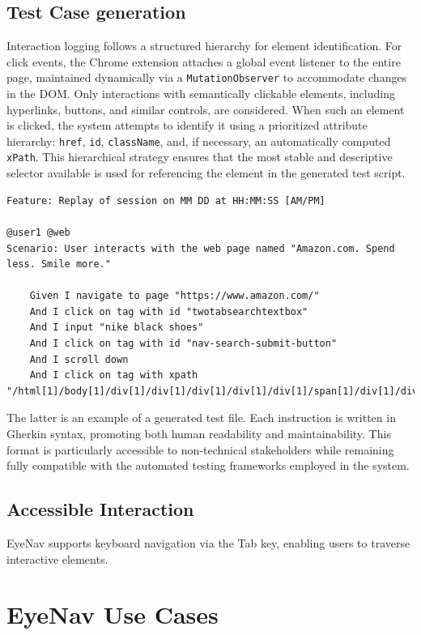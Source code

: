 \subsection{Test Case generation}

Interaction logging follows a structured hierarchy for element identification. For click events, the Chrome extension attaches a global event listener to the entire page, maintained dynamically via a \verb|MutationObserver| to accommodate changes in the DOM. Only interactions with semantically clickable elements, including hyperlinks, buttons, and similar controls, are considered. When such an element is clicked, the system attempts to identify it using a prioritized attribute hierarchy: \verb|href|, \verb|id|, \verb|className|, and, if necessary, an automatically computed \verb|xPath|. This hierarchical strategy ensures that the most stable and descriptive selector available is used for referencing the element in the generated test script.


\begin{lstlisting}
Feature: Replay of session on MM DD at HH:MM:SS [AM/PM]

@user1 @web
Scenario: User interacts with the web page named "Amazon.com. Spend less. Smile more."

	Given I navigate to page "https://www.amazon.com/"
	And I click on tag with id "twotabsearchtextbox"
	And I input "nike black shoes"
	And I click on tag with id "nav-search-submit-button"
	And I scroll down
	And I click on tag with xpath "/html[1]/body[1]/div[1]/div[1]/div[1]/div[1]/div[1]/span[1]/div[1]/div[9]/div[1]/div[1]/span[1]/div[1]/div[1]/div[1]/span[1]/a[1]/div[1]"
\end{lstlisting}

The latter is an example of a generated test file. Each instruction is written in Gherkin syntax, promoting both human readability and maintainability. This format is particularly accessible to non-technical stakeholders while remaining fully compatible with the automated testing frameworks employed in the system.

\subsection{Accessible Interaction}
EyeNav supports keyboard navigation via the Tab key, enabling users to traverse interactive elements.

\section{EyeNav Use Cases}

